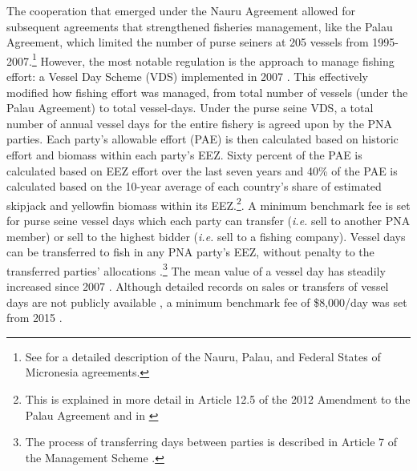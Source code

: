 \documentclass[9pt,twoside,lineno]{pnas-new}
\begin{document}
The cooperation that emerged under the Nauru Agreement allowed for subsequent
agreements that strengthened fisheries management, like the Palau
Agreement, which limited the number of purse seiners at 205 vessels from
1995-2007.\footnote{See \cite{havice_2010} for a detailed description of the Nauru, Palau, and Federal States of Micronesia agreements.} However, the most notable regulation is
the approach to manage fishing effort: a Vessel Day Scheme (VDS)
implemented in 2007 \citep{havice_2013}. This effectively modified how
fishing effort was managed, from total number of vessels (under the Palau
Agreement) to total vessel-days. 
Under the purse seine VDS, a total number of annual vessel days for the entire fishery is agreed upon by the PNA parties. Each party’s allowable effort (PAE) is then calculated based on historic effort and biomass within each party’s EEZ. Sixty percent of the PAE is calculated based on EEZ effort over the last seven years and 40\% of the PAE is calculated based on the 10-year average of each country’s share of estimated skipjack and yellowfin biomass within its EEZ.\footnote{This is explained in more detail in Article 12.5 of the 2012 Amendment to the Palau Agreement and in \cite{Hagrannsoknir2014}}. A minimum benchmark fee is set for purse seine vessel days which each party can transfer (\emph{i.e.} sell to another PNA member) or sell to the highest bidder (\emph{i.e.} sell to a fishing company). Vessel days can be transferred to fish in any PNA party’s EEZ, without penalty to the transferred parties' allocations \cite{PNA2016}.\footnote{The process of transferring days between parties is described in Article 7 of the Management Scheme \cite{PNA2016}.} The mean value of a vessel day has steadily increased since 2007 \citep{havice_2013}. 
Although detailed records on sales or transfers of vessel days are not publicly available \citep{havice_2013,yeeting2018stabilising}, a minimum benchmark fee of \$8,000/day was set from 2015 \citep{PNA2014a}.
\end{document}
